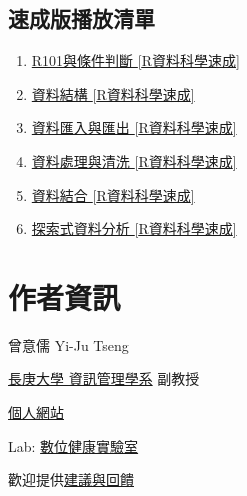 \documentclass[
]{book}
\providecommand{\tightlist}{%
  \setlength{\itemsep}{0pt}\setlength{\parskip}{0pt}}
\begin{document}
\hypertarget{ux901fux6210ux7248ux64adux653eux6e05ux55ae}{%
\section{速成版播放清單}\label{ux901fux6210ux7248ux64adux653eux6e05ux55ae}}

\begin{enumerate}
\def\labelenumi{\arabic{enumi}.}
\tightlist
\item
  \href{https://www.youtube.com/playlist?list=PLsKtsWy-7jOyNlKv41DdqYrxOlfLr7Ku7}{R101與條件判斷 {[}R資料科學速成{]}}
\item
  \href{https://www.youtube.com/playlist?list=PLsKtsWy-7jOzST2pUcH2emqOj0sUaKXnp}{資料結構 {[}R資料科學速成{]}}
\item
  \href{https://www.youtube.com/playlist?list=PLsKtsWy-7jOzUhXV4ODHb9UYtJ2GFXqMQ}{資料匯入與匯出 {[}R資料科學速成{]}}\\
\item
  \href{https://www.youtube.com/playlist?list=PLsKtsWy-7jOx08FhoUn3WodJzqPLTVIlG}{資料處理與清洗 {[}R資料科學速成{]}}\\
\item
  \href{https://www.youtube.com/playlist?list=PLsKtsWy-7jOwsn-MLpXKPjTAhnPghpsB5}{資料結合 {[}R資料科學速成{]}}\\
\item
  \href{https://www.youtube.com/playlist?list=PLsKtsWy-7jOyPb7JgaR3dVlVzJCUMlCCU}{探索式資料分析 {[}R資料科學速成{]}}
\end{enumerate}

\hypertarget{author}{%
\chapter*{作者資訊}\label{author}}

曾意儒 Yi-Ju Tseng

\href{http://im.cgu.edu.tw/bin/home.php}{長庚大學 資訊管理學系} 副教授

\href{https://yjtseng.info/}{個人網站}

Lab: \href{https://dhlab-tseng.github.io/}{數位健康實驗室}

歡迎提供\href{https://goo.gl/forms/5Htobvwy2vsB7yiF3}{建議與回饋}

  
\end{document}
